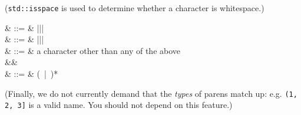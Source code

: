 (\texttt{std::isspace} is used to determine whether a character is
  whitespace.)

\begin{grammar}
    & ::= &  \term{(}\cfgsp |\cfgsp \term{\{}\cfgsp |\cfgsp \term{[}\cfgsp |\cfgsp \term{$<$} \\
   & ::= &  \term{)}\cfgsp |\cfgsp \term{\}}\cfgsp |\cfgsp \term{]}\cfgsp |\cfgsp \term{$>$} \\
   & ::= &  \textrm{a character other than any of the above} \\
&& \\
  & ::= &  \cfgsp  (\ |\ )*\cfgsp  {}
\end{grammar}

(Finally, we do not currently demand that the \textsl{types} of parens
  match up: e.g. \texttt{(1, 2, 3]} is a valid name. You should not
    depend on this feature.)
